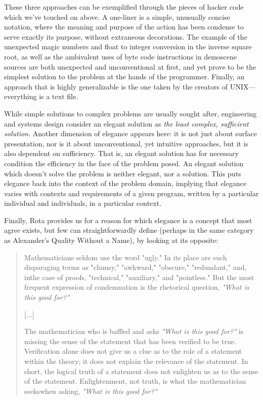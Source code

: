 \documentclass{article}
\begin{document}
These three approaches can be exemplified through the pieces of hacker code which we've touched on above. A one-liner is a simple, unusually concise notation, where the meaning and purpose of the action has been condense to serve exactly its purpose, without extraneous decorations. The example of the unexpected magic numbers and float to integer conversion in the inverse square root, as well as the ambivalent uses of byte code instructions in demoscene sources are both unexpected and unconventional at first, and yet prove to be the simplest solution to the problem at the hands of the programmer. Finally, an approach that is highly generalizable is the one taken by the creators of UNIX—everything is a text file.

While simple solutions to complex problems are usually sought after, engineering and systems design consider an elegant solution as \emph{the least complex, sufficient solution}\cite{efatmaneshnik_definitions_2019}. Another dimension of elegance appears here: it is not just about surface presentation, nor is it about unconventional, yet intuitive approaches, but it is also dependent on sufficiency. That is, an elegant solution has for necessary condition the efficiency in the face of the problem posed. An elegant solution which doesn't solve the problem is neither elegant, nor a solution. This puts elegance back into the context of the problem domain, implying that elegance varies with contexts and requirements of a given program, written by a particular individual and individuals, in a particular context\cite{fuller_software_2008}.

Finally, Rota provides us for a reason for which elegance is a concept that most agree exists, but few can straightforwardly define (perhaps in the same category as Alexander's Quality Without a Name), by looking at its opposite:

\begin{quote}
  Mathematicians seldom use the word "ugly." In its place are such disparaging terms as "clumsy," "awkward," "obscure," "redundant," and, inthe case of proofs, "technical," "auxiliary," and "pointless." But the most frequent expression of condemnation is the rhetorical question, \emph{"What is this good for?"}

  [...]

  The mathematician who is baffled and asks \emph{"What is this good for?"} is missing the sense of the statement that has been verified to be true. Verification alone does not give us a clue as to the role of a statement within the theory; it does not explain the relevance of the statement. In short, the logical truth of a statement does not enlighten us as to the sense of the statement. Enlightenment, not truth, is what the mathematician seekswhen asking, \emph{"What is this good for?"}
\end{quote}
\end{document}
